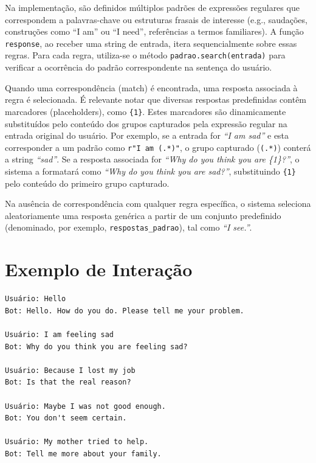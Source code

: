 \documentclass[14pt,a4paper,oneside]{book}
\begin{document}
Na implementação, são definidos múltiplos padrões de expressões regulares que correspondem a palavras-chave ou estruturas frasais de interesse (e.g., saudações, construções como ``I am'' ou ``I need'', referências a termos familiares). A função \texttt{response}, ao receber uma string de entrada, itera sequencialmente sobre essas regras. Para cada regra, utiliza-se o método \texttt{padrao.search(entrada)} para verificar a ocorrência do padrão correspondente na sentença do usuário.

Quando uma correspondência (match) é encontrada, uma resposta associada à regra é selecionada. É relevante notar que diversas respostas predefinidas contêm marcadores (placeholders), como \texttt{\{1\}}. Estes marcadores são dinamicamente substituídos pelo conteúdo dos grupos capturados pela expressão regular na entrada original do usuário. Por exemplo, se a entrada for \textit{``I am sad''} e esta corresponder a um padrão como \texttt{r"I am (.*)"}, o grupo capturado (\texttt{(.*)}) conterá a string \textit{``sad''}. Se a resposta associada for \textit{``Why do you think you are \{1\}?''}, o sistema a formatará como \textit{``Why do you think you are sad?''}, substituindo \texttt{\{1\}} pelo conteúdo do primeiro grupo capturado.

Na ausência de correspondência com qualquer regra específica, o sistema seleciona aleatoriamente uma resposta genérica a partir de um conjunto predefinido (denominado, por exemplo, \texttt{respostas\_padrao}), tal como \textit{``I see.''}.

\section{Exemplo de Interação}

\begin{lstlisting}
Usuário: Hello
Bot: Hello. How do you do. Please tell me your problem.

Usuário: I am feeling sad
Bot: Why do you think you are feeling sad?

Usuário: Because I lost my job
Bot: Is that the real reason?

Usuário: Maybe I was not good enough.
Bot: You don't seem certain.

Usuário: My mother tried to help.
Bot: Tell me more about your family.
\end{lstlisting}
\end{document}
